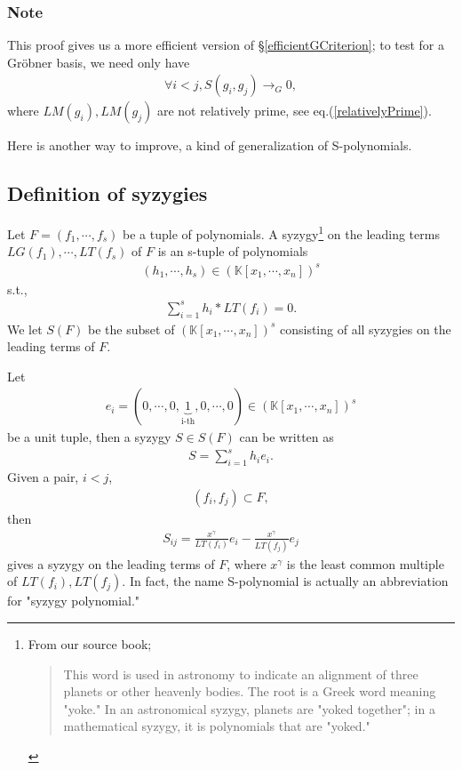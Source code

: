 \documentclass[11pt]{book}
\begin{document}
\subsubsection{Note}
This proof gives us a more efficient version of \S\ref{efficientGCriterion}; to test for a Gr\"obner basis, we need only have
\begin{eqnarray}
\forall i<j, S(g_i, g_j) \to_G 0,
\end{eqnarray}
where $LM(g_i),LM(g_j)$ are not relatively prime, see eq.(\ref{relativelyPrime}).

Here is another way to improve, a kind of generalization of S-polynomials.

\subsection{Definition of syzygies}
Let $F = (f_1, \cdots, f_s)$ be a tuple of polynomials.
A syzygy\footnote{
From our source book;
\begin{quotation}
This word is used in astronomy to indicate an alignment of three planets or other heavenly bodies.
The root is a Greek word meaning "yoke."
In an astronomical syzygy, planets are "yoked together"; in a mathematical syzygy, it is polynomials that are "yoked."
\end{quotation}
} on the leading terms $LG(f_1), \cdots, LT(f_s)$ of $F$ is an s-tuple of polynomials
\begin{eqnarray}
(h_1, \cdots, h_s) \in (\mathbb{K}[x_1, \cdots, x_n])^s
\end{eqnarray}
s.t.,
\begin{eqnarray}
\sum_{i=1}^s h_i * LT(f_i) = 0.
\end{eqnarray}
We let $S(F)$ be the subset of $(\mathbb{K}[x_1, \cdots, x_n])^s$ consisting of all syzygies on the leading terms of $F$.

Let
\begin{eqnarray}
e_i = (0, \cdots, 0,\underbrace{1}_{\text{i-th}},0, \cdots, 0) \in (\mathbb{K}[x_1, \cdots, x_n])^s
\end{eqnarray}
be a unit tuple, then a syzygy $S \in S(F)$ can be written as
\begin{eqnarray}
S = \sum_{i=1}^s h_i e_i.
\end{eqnarray}
Given a pair, $i<j$,
\begin{eqnarray}
(f_i, f_j) \subset F,
\end{eqnarray}
then 
\begin{eqnarray}
S_{ij} =  \frac{x^\gamma}{LT(f_i)} e_i - \frac{x^\gamma}{LT(f_j)} e_j
\end{eqnarray}
gives a syzygy on the leading terms of $F$, where $x^\gamma$ is the least common multiple of $LT(f_i), LT(f_j)$.
In fact, the name S-polynomial is actually an abbreviation for "syzygy polynomial."
\end{document}
